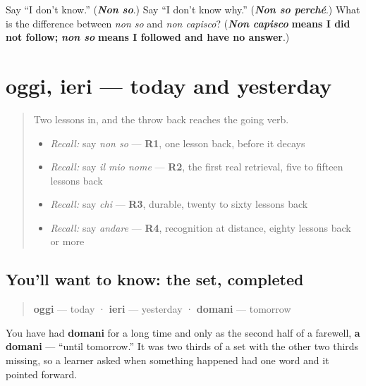 \begin{tcolorbox}[breakable,colback=teal!4,colframe=teal!35!black,title={Before you move on}]
Say \textquotedblleft{}I don't know.\textquotedblright{} (\emph{\textbf{Non so}}.) Say \textquotedblleft{}I don't know why.\textquotedblright{} (\emph{\textbf{Non so perché}}.) What is the difference between \emph{non so} and \emph{non capisco}? (\emph{\textbf{Non capisco}} \textbf{means I did not follow;} \emph{\textbf{non so}} \textbf{means I followed and have no answer}.)
\end{tcolorbox}
\section[oggi, ieri]{oggi, ieri — today and yesterday}

\label{lesson:IT-C35-oggi-ieri}



\begin{quote}
Two lessons in, and the throw back reaches the going verb.

\begin{itemize}
\raggedright
  \item \emph{Recall:} say \emph{non so} — \textbf{R1}, one lesson back, before it decays
  \item \emph{Recall:} say \emph{il mio nome} — \textbf{R2}, the first real retrieval, five to fifteen lessons back
  \item \emph{Recall:} say \emph{chi} — \textbf{R3}, durable, twenty to sixty lessons back
  \item \emph{Recall:} say \emph{andare} — \textbf{R4}, recognition at distance, eighty lessons back or more
\end{itemize}
\end{quote}

\subsection*{You'll want to know: the set, completed}
\begin{quote}
\textbf{oggi} — today · \textbf{ieri} — yesterday · \textbf{domani} — tomorrow
\end{quote}

You have had \textbf{domani} for a long time and only as the second half of a farewell, \textbf{a domani} — \textquotedblleft{}until tomorrow.\textquotedblright{} It was two thirds of a set with the other two thirds missing, so a learner asked when something happened had one word and it pointed forward.

